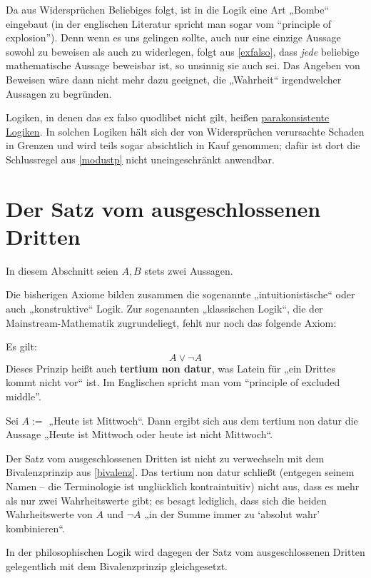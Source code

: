 \begin{vorschau} \label{explosion}
    Da aus Widersprüchen Beliebiges folgt, ist in die Logik eine Art „Bombe“ eingebaut (in der englischen Literatur spricht man sogar vom ``principle of explosion''). Denn wenn es uns gelingen sollte, auch nur eine einzige Aussage sowohl zu beweisen als auch zu widerlegen, folgt aus \cref{exfalso}, dass \emph{jede} beliebige mathematische Aussage beweisbar ist, so unsinnig sie auch sei. Das Angeben von Beweisen wäre dann nicht mehr dazu geeignet, die „Wahrheit“ irgendwelcher Aussagen zu begründen.
    
    Logiken, in denen das ex falso quodlibet nicht gilt, heißen \href{https://ncatlab.org/nlab/show/paraconsistent+logic}{parakonsistente Logiken}. In solchen Logiken hält sich der von Widersprüchen verursachte Schaden in Grenzen und wird teils sogar absichtlich in Kauf genommen; dafür ist dort die Schlussregel aus \cref{modustp} nicht uneingeschränkt anwendbar.
\end{vorschau}





\section{Der Satz vom ausgeschlossenen Dritten}


In diesem Abschnitt seien $A,B$ stets zwei Aussagen.

Die bisherigen Axiome bilden zusammen die sogenannte „intuitionistische“ oder auch „konstruktive“ Logik. Zur sogenannten „klassischen Logik“, die der Mainstream-Mathematik zugrundeliegt, fehlt nur noch das folgende Axiom:


\begin{axiom} \label{excludedmiddle}  
    Es gilt:
        \[ A\lor \neg A \]
    Dieses Prinzip heißt auch \textbf{tertium non datur}, was Latein für „ein Drittes kommt nicht vor“ ist. Im Englischen spricht man vom ``principle of excluded middle''.
\end{axiom}


\begin{bsp}
    Sei $A:=$ „Heute ist Mittwoch“. Dann ergibt sich aus dem tertium non datur die Aussage „Heute ist Mittwoch oder heute ist nicht Mittwoch“.
\end{bsp}


\begin{bem}
    Der Satz vom ausgeschlossenen Dritten ist nicht zu verwechseln mit dem Bivalenzprinzip aus \cref{bivalenz}. Das tertium non datur schließt (entgegen seinem Namen -- die Terminologie ist unglücklich kontraintuitiv) nicht aus, dass es mehr als nur zwei Wahrheitswerte gibt; es besagt lediglich, dass sich die beiden Wahrheitswerte von $A$ und $\neg A$ „in der Summe immer zu `absolut wahr' kombinieren“.
    
    In der philosophischen Logik wird dagegen der Satz vom ausgeschlossenen Dritten gelegentlich mit dem Bivalenzprinzip gleichgesetzt.
\end{bem}


